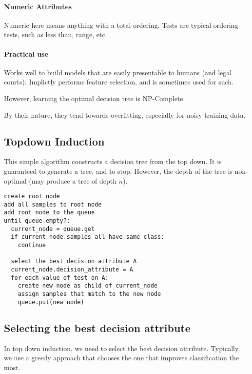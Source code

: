 \documentclass{idc_msc}
\begin{document}
\paragraph{Numeric Attributes}

Numeric here means anything with a total ordering.
Tests are typical ordering tests, such as less than, range, etc.

\paragraph{Practical use}

Works well to build models that are easily presentable to humans (and legal courts).
Implictly performs feature selection, and is sometimes used for such.

However, learning the optimal decision tree is NP-Complete.

By their nature, they tend towards overfitting, especially for noisy training data.

\subsection{Topdown Induction}

This simple algorithm constructs a decision tree from the top down.
It is guaranteed to generate a tree, and to stop.
However, the depth of the tree is non-optimal (may produce a tree of depth \(n\)).

\begin{lstlisting}[frame=L,mathescape=true,title={Top down Induction}]
create root node
add all samples to root node
add root node to the queue
until queue.empty?:
  current_node = queue.get
  if current_node.samples all have same class:
    continue

  select the best decision attribute A
  current_node.decision_attribute = A
  for each value of test on A:
    create new node as child of current_node
    assign samples that match to the new node
    queue.put(new node)
\end{lstlisting}

\subsection{Selecting the best decision attribute}

In top down induction, we need to select the best decision attribute.
Typically, we use a greedy approach that chooses the one that improves classification the most.
\end{document}
